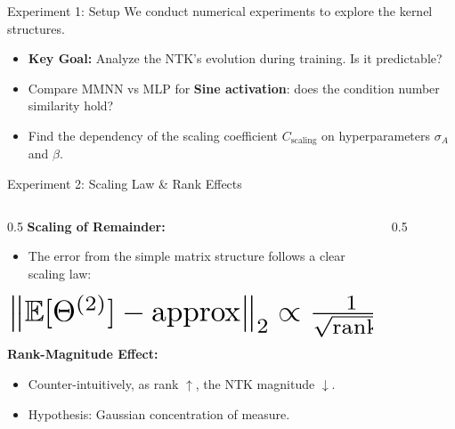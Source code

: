 \documentclass{beamer}
\begin{document}
\begin{frame}{Experiment 1: Setup}
We conduct numerical experiments to explore the kernel structures.
\begin{itemize}
    \item \textbf{Key Goal:} Analyze the NTK's evolution during training. Is it predictable?
    \item Compare MMNN vs MLP for \textbf{Sine activation}: does the condition number similarity hold?
    \item Find the dependency of the scaling coefficient $C_{\text{scaling}}$ on hyperparameters $\sigma_A$ and $\beta$.
\end{itemize}
\end{frame}

\begin{frame}{Experiment 2: Scaling Law \& Rank Effects}
\begin{columns}[T]
    \begin{column}{0.5\textwidth}
        \textbf{Scaling of Remainder:}
        \begin{itemize}
            \item The error from the simple matrix structure follows a clear scaling law:
        \end{itemize}
        \begin{equation*}
        \resizebox{0.9\hsize}{!}{$
        \left\| \mathbb{E}[\Theta^{(2)}] - \text{approx} \right\|_2 \propto \frac{1}{\sqrt{\text{rank}_1}}
        $}
        \end{equation*}
        \textbf{Rank-Magnitude Effect:}
        \begin{itemize}
            \item Counter-intuitively, as rank $\uparrow$, the NTK magnitude $\downarrow$.
            \item Hypothesis: Gaussian concentration of measure.
        \end{itemize}
    \end{column}
    \begin{column}{0.5\textwidth}
        \begin{figure}
        \end{figure}
    \end{column}
\end{columns}
\end{frame}
\end{document}
